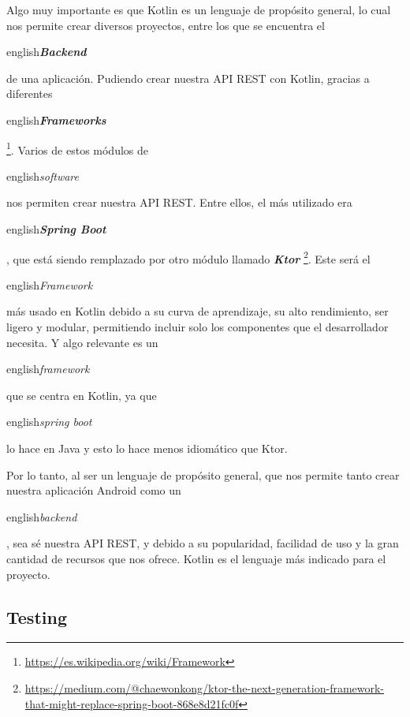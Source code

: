Algo muy importante es que Kotlin es un lenguaje de propósito general, lo cual nos permite crear diversos proyectos, entre los que se encuentra el \begin{otherlanguage}
{english}\textit{\textbf{Backend}}\end{otherlanguage} de una aplicación. Pudiendo crear nuestra API REST con Kotlin, gracias a diferentes \begin{otherlanguage}
{english}\textit{\textbf{Frameworks}}\end{otherlanguage} \footnote{\url{https://es.wikipedia.org/wiki/Framework}}. Varios de estos módulos de \begin{otherlanguage}
{english}\textit{software}\end{otherlanguage} nos permiten crear nuestra API REST. Entre ellos, el más utilizado era \begin{otherlanguage}
{english}\textbf{\textit{Spring Boot}}\end{otherlanguage}, que está siendo remplazado por otro módulo llamado \textbf{\textit{Ktor}} \footnote{\url{https://medium.com/@chaewonkong/ktor-the-next-generation-framework-that-might-replace-spring-boot-868e8d21fc0f}}. Este será el \begin{otherlanguage}
{english}\textit{Framework}\end{otherlanguage} más usado en Kotlin debido a su curva de aprendizaje, su alto rendimiento, ser ligero y modular, permitiendo incluir solo los componentes que el desarrollador necesita. Y algo relevante es un \begin{otherlanguage}
{english}\textit{framework}\end{otherlanguage} que se centra en Kotlin, ya que \begin{otherlanguage}
{english}\textit{spring boot}\end{otherlanguage} lo hace en Java y esto lo hace menos idiomático que Ktor.

Por lo tanto, al ser un lenguaje de propósito general, que nos permite tanto crear nuestra aplicación Android como un \begin{otherlanguage}
{english}\textit{backend}\end{otherlanguage}, sea sé nuestra API REST, y debido a su popularidad, facilidad de uso y la gran cantidad de recursos que nos ofrece. Kotlin es el lenguaje más indicado para el proyecto.


\subsection{Testing}


